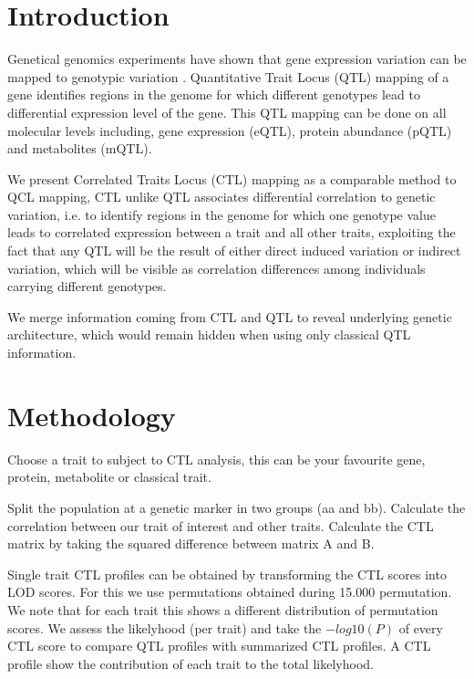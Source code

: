 \documentclass{bioinfo}
\begin{document}
\section{Introduction}
  Genetical genomics experiments have shown that gene expression variation can be mapped to 
  genotypic variation \cite{Jansen:2001}. Quantitative Trait Locus (QTL) mapping of a 
  gene identifies regions in the genome for which different genotypes lead to differential 
  expression level of the gene. This QTL mapping can be done on all molecular levels including, 
  gene expression (eQTL), protein abundance (pQTL) and metabolites (mQTL).
  
  We present Correlated Traits Locus (CTL) mapping as a comparable method to QCL mapping, 
  CTL unlike QTL associates differential correlation to genetic variation, i.e. to identify regions in the 
  genome for which one genotype value leads to correlated expression between a trait and all 
  other traits, exploiting the fact that any QTL will be the result of either direct induced 
  variation or indirect variation, which will be visible as correlation differences among 
  individuals carrying different genotypes.
  
  We merge information coming from CTL and QTL to reveal underlying genetic architecture, which 
  would remain hidden when using only classical QTL information.

\section{Methodology}
  Choose a trait to subject to CTL analysis, this can be your favourite gene, 
  protein, metabolite or classical trait.

  Split the population at a genetic marker in two groups (aa and bb). Calculate the correlation 
  between our trait of interest and other traits. Calculate the CTL matrix by taking the 
  squared difference between matrix A and B.

  Single trait CTL profiles can be obtained by transforming the CTL scores into LOD scores. 
  For this we use permutations obtained during 15.000 permutation. We note that for each trait this 
  shows a different distribution of permutation scores. We assess the likelyhood (per trait) and 
  take the $-log10(P)$ of every CTL score to compare QTL profiles with summarized CTL profiles. 
  A CTL profile show the contribution of each trait to the total likelyhood.
\end{document}
